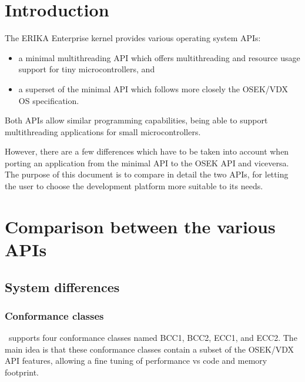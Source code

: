 \documentclass[12pt,a4paper,normalheadings,titlepage]{scrreprt}
\begin{document}
\maketitle

\pagebreak

\tableofcontents

\chapter{Introduction}

The ERIKA Enterprise kernel provides various operating system APIs:
\begin{itemize}
\item a minimal multithreading API which
  offers multithreading and resource usage support for tiny
  microcontrollers, and
\item a superset of the minimal API
  which follows more closely the OSEK/VDX OS specification.
\end{itemize}

Both APIs allow similar programming capabilities, being able to support
multithreading applications for small microcontrollers.

However, there are a few differences which have to be taken into
account when porting an application from the minimal API to the OSEK API and
viceversa. The purpose of this document is to compare in detail the two APIs,
for letting the user to choose the development platform more suitable to its 
needs.


\chapter{Comparison between the various APIs}

\section{System differences}

\subsection{Conformance classes}

\ee\ supports four conformance classes named BCC1, BCC2, ECC1, and
ECC2. The main idea is that these conformance classes contain a subset
of the OSEK/VDX API features, allowing a fine tuning of performance vs
code and memory footprint.
\end{document}
